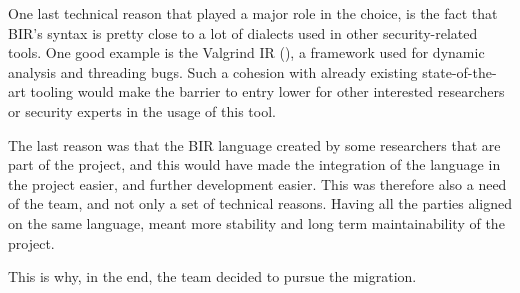 One last technical reason that played a major role in the choice, is the fact
that BIR's syntax is pretty close to a lot of dialects used in other security-related
tools. One good example is the Valgrind IR (\cite{valgrind}), a framework used
for dynamic analysis and threading bugs. Such a cohesion with already existing state-of-the-art
tooling would make the barrier to entry lower for other interested researchers or
security experts in the usage of this tool.

The last reason was that the BIR language created by some researchers that are part
of the project, and this would have made the integration of the language in the
project easier, and further development easier. This was therefore also a need
of the team, and not only a set of technical reasons. Having all the parties
aligned on the same language, meant more stability and long term maintainability
of the project.

This is why, in the end, the team decided to pursue the migration.